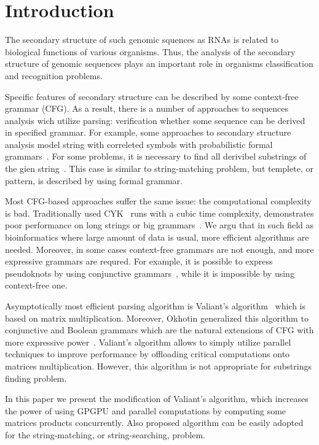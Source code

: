 \section{\bf Introduction}

The secondary structure of such genomic squences as RNAs is related to biological functions of various organisms.
Thus, the analysis of the secondary structure of genomic sequences plays an important role in organisms classification and recognition problems.

Specific features of secondary structure can be described by some context-free grammar (CFG).
As a result, there is a number of approaches to sequences analysis wich utilize parsing: verification whether some sequence can be derived in specified grammar.
For example, some approaches to secondary structure analysis model string with correleted symbols with probabilistic formal grammars~\cite{knudsen1999rna, dowell2004evaluation}.
For some problems, it is necessary to find  all derivibel substrings of the gien string~\cite{durbin1996biological}.
This case is similar to string-matching problem, but templete, or pattern, is described by using formal grammar.

Most CFG-based approaches suffer the same issue: the computational complexity is bad.
Traditionally used CYK~\cite{kasami1966efficient, Younger:1966:CLP:1441427.1442019} runs with a cubic time complexity, demonstrates poor performance on long strings or big grammars~\cite{liu2005parallel}.
We argu that in such field as bioinformatics where large amount of data is usual, more efficient algorithms are needed.
Moreover, in some cases context-free grammars are not enough, and more expressive grammars are requred.
For example, it is possible to express pseudoknots by using conjunctive grammars~\cite{zier2013rna}, while it is impossible by using context-free one.

Asymptotically most efficient parsing algorithm is Valiant's algorithm~\cite{Valiant:1975:GCR:1739932.1740048} which is based on matrix multiplication.
Moreover, Okhotin generalized this algorithm to conjunctive and Boolean grammars which are the natural extensions of CFG with more expressive power~\cite{Okhotin:2014:PMM:2565359.2565379}.
Valiant’s algorithm allows to simply utilize parallel techniques to improve performance by offloading critical computations onto matrices multiplication.
However, this algorithm is not appropriate for substrings finding problem.

In this paper we present the modification of Valiant's algorithm, which increases the power of using GPGPU and parallel computations by computing some matrices products concurrently.
Also proposed algorithm can be easily adopted for the string-matching, or string-searching, problem.
